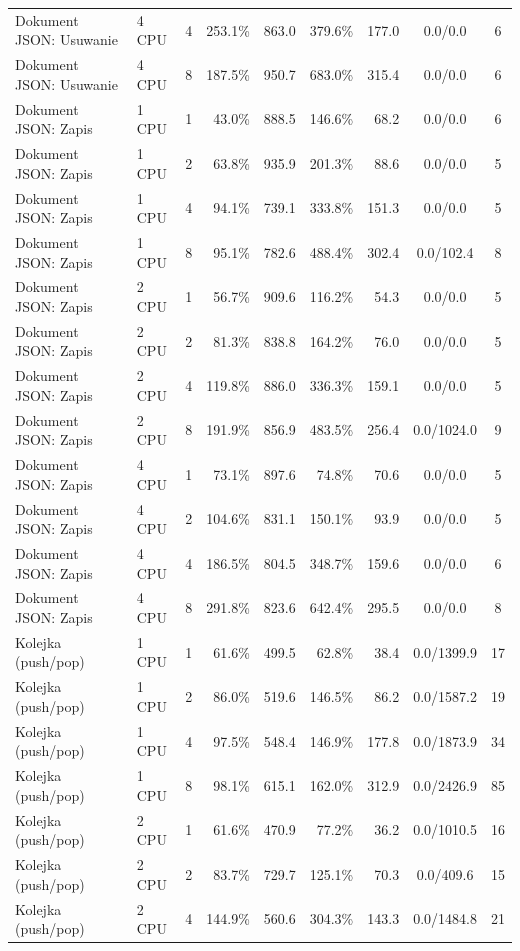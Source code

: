 \begin{table}[ht]
{\begin{tabular}{llcrrrrcc}
Dokument JSON: Usuwanie & 4 CPU & 4 & 253.1\% & 863.0 & 379.6\% & 177.0 & 0.0/0.0 & 6 \\
Dokument JSON: Usuwanie & 4 CPU & 8 & 187.5\% & 950.7 & 683.0\% & 315.4 & 0.0/0.0 & 6 \\
Dokument JSON: Zapis & 1 CPU & 1 & 43.0\% & 888.5 & 146.6\% & 68.2 & 0.0/0.0 & 6 \\
Dokument JSON: Zapis & 1 CPU & 2 & 63.8\% & 935.9 & 201.3\% & 88.6 & 0.0/0.0 & 5 \\
Dokument JSON: Zapis & 1 CPU & 4 & 94.1\% & 739.1 & 333.8\% & 151.3 & 0.0/0.0 & 5 \\
Dokument JSON: Zapis & 1 CPU & 8 & 95.1\% & 782.6 & 488.4\% & 302.4 & 0.0/102.4 & 8 \\
Dokument JSON: Zapis & 2 CPU & 1 & 56.7\% & 909.6 & 116.2\% & 54.3 & 0.0/0.0 & 5 \\
Dokument JSON: Zapis & 2 CPU & 2 & 81.3\% & 838.8 & 164.2\% & 76.0 & 0.0/0.0 & 5 \\
Dokument JSON: Zapis & 2 CPU & 4 & 119.8\% & 886.0 & 336.3\% & 159.1 & 0.0/0.0 & 5 \\
Dokument JSON: Zapis & 2 CPU & 8 & 191.9\% & 856.9 & 483.5\% & 256.4 & 0.0/1024.0 & 9 \\
Dokument JSON: Zapis & 4 CPU & 1 & 73.1\% & 897.6 & 74.8\% & 70.6 & 0.0/0.0 & 5 \\
Dokument JSON: Zapis & 4 CPU & 2 & 104.6\% & 831.1 & 150.1\% & 93.9 & 0.0/0.0 & 5 \\
Dokument JSON: Zapis & 4 CPU & 4 & 186.5\% & 804.5 & 348.7\% & 159.6 & 0.0/0.0 & 6 \\
Dokument JSON: Zapis & 4 CPU & 8 & 291.8\% & 823.6 & 642.4\% & 295.5 & 0.0/0.0 & 8 \\
Kolejka (push/pop) & 1 CPU & 1 & 61.6\% & 499.5 & 62.8\% & 38.4 & 0.0/1399.9 & 17 \\
Kolejka (push/pop) & 1 CPU & 2 & 86.0\% & 519.6 & 146.5\% & 86.2 & 0.0/1587.2 & 19 \\
Kolejka (push/pop) & 1 CPU & 4 & 97.5\% & 548.4 & 146.9\% & 177.8 & 0.0/1873.9 & 34 \\
Kolejka (push/pop) & 1 CPU & 8 & 98.1\% & 615.1 & 162.0\% & 312.9 & 0.0/2426.9 & 85 \\
Kolejka (push/pop) & 2 CPU & 1 & 61.6\% & 470.9 & 77.2\% & 36.2 & 0.0/1010.5 & 16 \\
Kolejka (push/pop) & 2 CPU & 2 & 83.7\% & 729.7 & 125.1\% & 70.3 & 0.0/409.6 & 15 \\
Kolejka (push/pop) & 2 CPU & 4 & 144.9\% & 560.6 & 304.3\% & 143.3 & 0.0/1484.8 & 21 \\

\end{tabular}}
\end{table}
